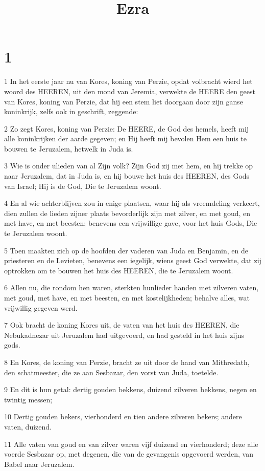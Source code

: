 

\title{Ezra}



\chapter{1}

\par 1 In het eerste jaar nu van Kores, koning van Perzie, opdat volbracht wierd het woord des HEEREN, uit den mond van Jeremia, verwekte de HEERE den geest van Kores, koning van Perzie, dat hij een stem liet doorgaan door zijn ganse koninkrijk, zelfs ook in geschrift, zeggende:
\par 2 Zo zegt Kores, koning van Perzie: De HEERE, de God des hemels, heeft mij alle koninkrijken der aarde gegeven; en Hij heeft mij bevolen Hem een huis te bouwen te Jeruzalem, hetwelk in Juda is.
\par 3 Wie is onder ulieden van al Zijn volk? Zijn God zij met hem, en hij trekke op naar Jeruzalem, dat in Juda is, en hij bouwe het huis des HEEREN, des Gods van Israel; Hij is de God, Die te Jeruzalem woont.
\par 4 En al wie achterblijven zou in enige plaatsen, waar hij als vreemdeling verkeert, dien zullen de lieden zijner plaats bevorderlijk zijn met zilver, en met goud, en met have, en met beesten; benevens een vrijwillige gave, voor het huis Gods, Die te Jeruzalem woont.
\par 5 Toen maakten zich op de hoofden der vaderen van Juda en Benjamin, en de priesteren en de Levieten, benevens een iegelijk, wiens geest God verwekte, dat zij optrokken om te bouwen het huis des HEEREN, die te Jeruzalem woont.
\par 6 Allen nu, die rondom hen waren, sterkten hunlieder handen met zilveren vaten, met goud, met have, en met beesten, en met kostelijkheden; behalve alles, wat vrijwillig gegeven werd.
\par 7 Ook bracht de koning Kores uit, de vaten van het huis des HEEREN, die Nebukadnezar uit Jeruzalem had uitgevoerd, en had gesteld in het huis zijns gods.
\par 8 En Kores, de koning van Perzie, bracht ze uit door de hand van Mithredath, den schatmeester, die ze aan Sesbazar, den vorst van Juda, toetelde.
\par 9 En dit is hun getal: dertig gouden bekkens, duizend zilveren bekkens, negen en twintig messen;
\par 10 Dertig gouden bekers, vierhonderd en tien andere zilveren bekers; andere vaten, duizend.
\par 11 Alle vaten van goud en van zilver waren vijf duizend en vierhonderd; deze alle voerde Sesbazar op, met degenen, die van de gevangenis opgevoerd werden, van Babel naar Jeruzalem.

